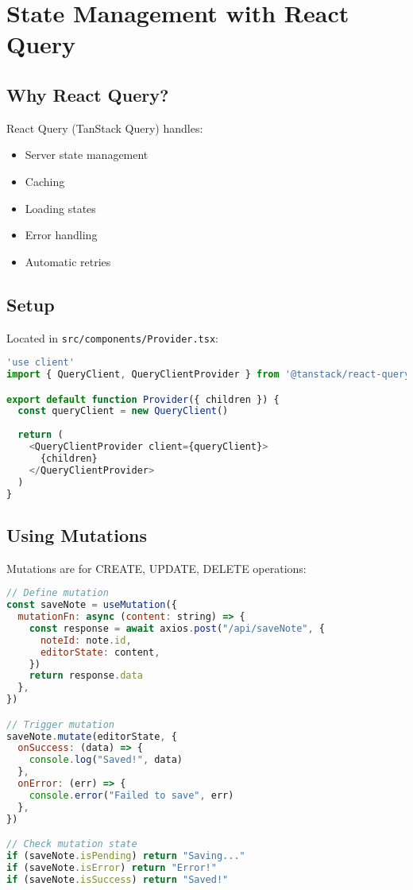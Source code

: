 \documentclass[11pt,a4paper]{article}
\begin{document}
\section{State Management with React Query}

\subsection{Why React Query?}

React Query (TanStack Query) handles:
\begin{itemize}
    \item Server state management
    \item Caching
    \item Loading states
    \item Error handling
    \item Automatic retries
\end{itemize}

\subsection{Setup}

Located in \texttt{src/components/Provider.tsx}:

\begin{lstlisting}[language=JavaScript]
'use client'
import { QueryClient, QueryClientProvider } from '@tanstack/react-query'

export default function Provider({ children }) {
  const queryClient = new QueryClient()
  
  return (
    <QueryClientProvider client={queryClient}>
      {children}
    </QueryClientProvider>
  )
}
\end{lstlisting}

\subsection{Using Mutations}

Mutations are for CREATE, UPDATE, DELETE operations:

\begin{lstlisting}[language=JavaScript]
// Define mutation
const saveNote = useMutation({
  mutationFn: async (content: string) => {
    const response = await axios.post("/api/saveNote", {
      noteId: note.id,
      editorState: content,
    })
    return response.data
  },
})

// Trigger mutation
saveNote.mutate(editorState, {
  onSuccess: (data) => {
    console.log("Saved!", data)
  },
  onError: (err) => {
    console.error("Failed to save", err)
  },
})

// Check mutation state
if (saveNote.isPending) return "Saving..."
if (saveNote.isError) return "Error!"
if (saveNote.isSuccess) return "Saved!"
\end{lstlisting}
\end{document}
